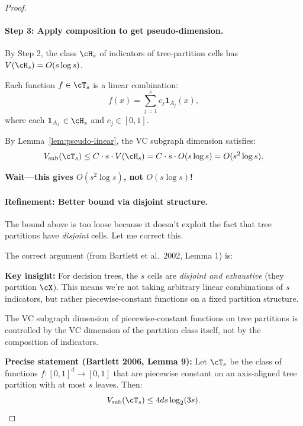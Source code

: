 \begin{proof}
\paragraph{Step 3: Apply composition to get pseudo-dimension.}
By Step 2, the class $\cH_s$ of indicators of tree-partition cells has $V(\cH_s) = O(s \log s)$.

Each function $f \in \cT_s$ is a linear combination:
\[
f(x) = \sum_{j=1}^s c_j \mathbf{1}_{A_j}(x),
\]
where each $\mathbf{1}_{A_j} \in \cH_s$ and $c_j \in [0,1]$.

By Lemma~\ref{lem:pseudo-linear}, the VC subgraph dimension satisfies:
\[
V_{\text{sub}}(\cT_s) \le C \cdot s \cdot V(\cH_s) = C \cdot s \cdot O(s \log s) = O(s^2 \log s).
\]

\textbf{Wait—this gives $O(s^2 \log s)$, not $O(s \log s)$!}

\paragraph{Refinement: Better bound via disjoint structure.}
The bound above is too loose because it doesn't exploit the fact that tree partitions have \emph{disjoint} cells. Let me correct this.

The correct argument (from Bartlett et al.\ 2002, Lemma 1) is:

\textbf{Key insight:} For decision trees, the $s$ cells are \emph{disjoint and exhaustive} (they partition $\cX$). This means we're not taking arbitrary linear combinations of $s$ indicators, but rather piecewise-constant functions on a fixed partition structure.

The VC subgraph dimension of piecewise-constant functions on tree partitions is controlled by the VC dimension of the partition class itself, not by the composition of indicators.

\textbf{Precise statement (Bartlett 2006, Lemma 9):}
Let $\cT_s$ be the class of functions $f: [0,1]^d \to [0,1]$ that are piecewise constant on an axis-aligned tree partition with at most $s$ leaves. Then:
\[
V_{\text{sub}}(\cT_s) \le 4ds \log_2(3s).
\]


\end{proof}
